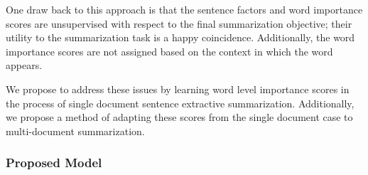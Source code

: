 One draw back to this approach is that the sentence factors and word 
importance scores are unsupervised with respect to the final summarization
objective; their utility to the summarization task is a happy coincidence.
Additionally, the word importance scores are not assigned based on the 
context in which the word appears.

We propose to address these issues by learning word level importance 
scores in the process of single document sentence extractive summarization.
Additionally, we propose a method of adapting these scores from the 
single document case to multi-document summarization.

\subsubsection{Proposed Model}


%
%
%
%
%

